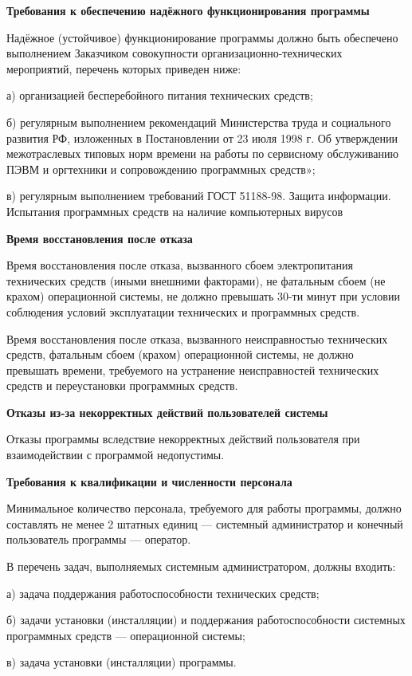 \textbf{Требования к обеспечению надёжного функционирования программы}

Надёжное (устойчивое) функционирование программы должно быть обеспечено выполнением
Заказчиком совокупности организационно-технических мероприятий, перечень которых приведен ниже:

а) организацией бесперебойного питания технических средств;

б) регулярным выполнением рекомендаций Министерства труда и социального развития РФ,
изложенных в Постановлении от 23 июля 1998 г. Об утверждении межотраслевых типовых норм
времени на работы по сервисному обслуживанию ПЭВМ и оргтехники и сопровождению программных средств»;

в) регулярным выполнением требований ГОСТ 51188-98. Защита информации. Испытания программных средств на наличие компьютерных вирусов

\textbf{Время восстановления после отказа}

Время восстановления после отказа, вызванного сбоем электропитания технических средств (иными внешними факторами),
не фатальным сбоем (не крахом) операционной системы, не должно превышать 30-ти минут при условии соблюдения условий
эксплуатации технических и программных средств.

Время восстановления после отказа, вызванного неисправностью технических средств, фатальным сбоем (крахом) операционной
системы, не должно превышать времени, требуемого на устранение неисправностей технических средств и переустановки программных средств.

\textbf{Отказы из-за некорректных действий пользователей системы}

Отказы программы вследствие некорректных действий пользователя при взаимодействии с программой недопустимы.

\textbf{Требования к квалификации и численности персонала}

Минимальное количество персонала, требуемого для работы программы, должно составлять не менее 2 штатных единиц —
системный администратор и конечный пользователь программы — оператор.

В перечень задач, выполняемых системным администратором, должны входить:

а) задача поддержания работоспособности технических средств;

б) задачи установки (инсталляции) и поддержания работоспособности системных программных средств — операционной системы;

в) задача установки (инсталляции) программы.

